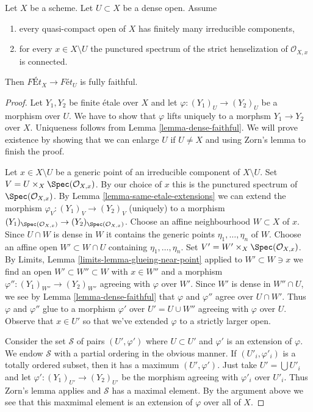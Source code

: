 \begin{lemma}
\label{lemma-quasi-compact-dense-open-connected-at-infinity}
Let $X$ be a scheme. Let $U \subset X$ be a dense open. Assume
\begin{enumerate}
\item every quasi-compact open of $X$ has finitely many
irreducible components,
\item for every $x \in X \setminus U$ the punctured spectrum of the
strict henselization of $\mathcal{O}_{X, x}$ is connected.
\end{enumerate}
Then $\textit{F\'Et}_X \to \textit{F\'et}_U$ is fully faithful.
\end{lemma}

\begin{proof}
Let $Y_1, Y_2$ be finite \'etale over $X$ and let
$\varphi : (Y_1)_U \to (Y_2)_U$ be a morphism over $U$. We have to show that
$\varphi$ lifts uniquely to a morphsm $Y_1 \to Y_2$ over $X$.
Uniqueness follows from Lemma \ref{lemma-dense-faithful}.
We will prove existence by showing that we can enlarge $U$
if $U \not = X$ and using Zorn's lemma to finish the proof.

\medskip\noindent
Let $x \in X \setminus U$ be a generic point of an irreducible component
of $X \setminus U$. Set $V = U \times_X \Spec(\mathcal{O}_{X, x})$.
By our choice of $x$ this is the punctured spectrum of
$\Spec(\mathcal{O}_{X, x})$. By
Lemma \ref{lemma-same-etale-extensions}
we can extend the morphism $\varphi_V : (Y_1)_V \to (Y_2)_V$
(uniquely) to a morphism
$(Y_1)_{\Spec(\mathcal{O}_{X, x})} \to (Y_2)_{\Spec(\mathcal{O}_{X, x})}$.
Choose an affine neighbourhood $W \subset X$ of $x$.
Since $U \cap W$ is dense in $W$ it contains the generic points
$\eta_1, \ldots, \eta_n$ of $W$. Choose an affine open
$W' \subset W \cap U$ containing $\eta_1, \ldots, \eta_n$.
Set $V' = W' \times_X \Spec(\mathcal{O}_{X, x})$.
By Limits, Lemma \ref{limits-lemma-glueing-near-point}
applied to $W' \subset W \ni x$
we find an open $W' \subset W'' \subset W$ with $x \in W''$
and a morphism $\varphi'' : (Y_1)_{W''} \to (Y_2)_{W''}$
agreeing with $\varphi$ over $W'$. Since $W'$ is dense in
$W'' \cap U$, we see by Lemma \ref{lemma-dense-faithful}
that $\varphi$ and $\varphi''$ agree over $U \cap W'$.
Thus $\varphi$ and $\varphi''$ glue to a morphism
$\varphi'$ over $U' = U \cup W''$ agreeing with $\varphi$ over $U$.
Observe that $x \in U'$ so that we've extended $\varphi$
to a strictly larger open.

\medskip\noindent
Consider the set $\mathcal{S}$ of pairs $(U', \varphi')$ where $U \subset U'$
and $\varphi'$ is an extension of $\varphi$. We endow $\mathcal{S}$
with a partial ordering in the obvious manner. If $(U'_i, \varphi'_i)$
is a totally ordered subset, then it has a maximum $(U', \varphi')$.
Just take $U' = \bigcup U'_i$ and let
$\varphi' : (Y_1)_{U'} \to (Y_2)_{U'}$ be the morphism
agreeing with $\varphi'_i$ over $U'_i$. Thus Zorn's lemma applies
and $\mathcal{S}$ has a maximal element. By the argument above
we see that this maxmimal element is an extension of $\varphi$
over all of $X$.
\end{proof}

